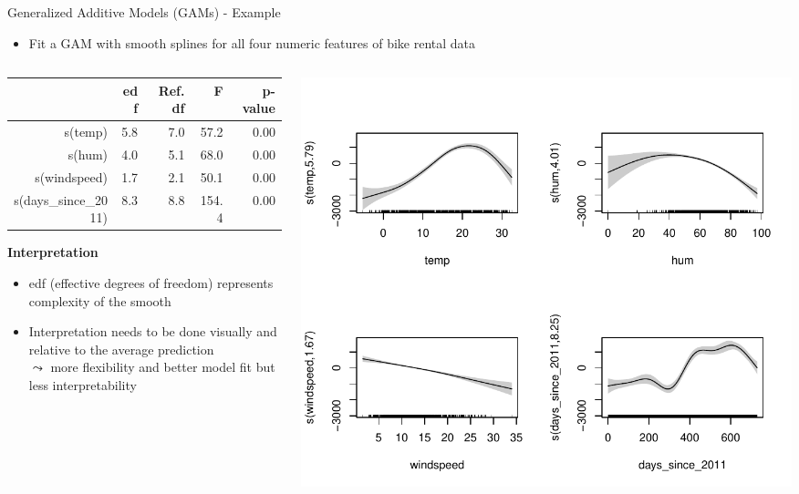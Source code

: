 \documentclass[11pt,compress,t,notes=noshow, aspectratio=169, xcolor=table]{beamer}
\begin{document}
\begin{frame}{Generalized Additive Models (GAMs) - Example}
    \begin{itemize}
    \item Fit a GAM with smooth splines for all four numeric features of bike rental data 
\end{itemize}

\begin{columns}[T]
\begin{column}{0.45\textwidth}
\begin{table}[ht]
\centering
\tiny
\begin{tabular}{rrrrr}
  \hline
 & edf & Ref.df & F & p-value \\ 
  \hline
s(temp) & 5.8 & 7.0 & 57.2 & 0.00 \\ 
  s(hum) & 4.0 & 5.1 & 68.0 & 0.00 \\ 
  s(windspeed) & 1.7 & 2.1 & 50.1 & 0.00 \\ 
  s(days\_since\_2011) & 8.3 & 8.8 & 154.4 & 0.00 \\ 
   \hline
\end{tabular}
\end{table}


\textbf{Interpretation}
\begin{itemize}
    \item edf (effective degrees of freedom) represents complexity of the smooth
    \item Interpretation needs to be done visually and relative to the average prediction\\
    $\leadsto$ more flexibility and better model fit but less interpretability
\end{itemize}
\end{column}
\hfill
\begin{column}{0.5\textwidth}
\includegraphics[width = \textwidth]{slides/interpretable-models/figure/gam_effects.pdf}
\end{column}
\end{columns}
\end{frame}
\end{document}
